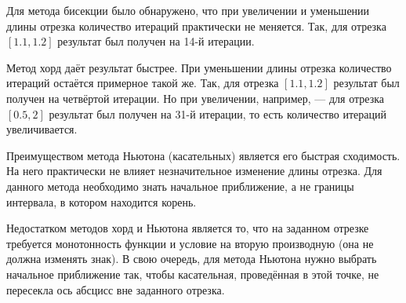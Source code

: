 Для метода бисекции было обнаружено, что при увеличении и уменьшении длины отрезка количество итераций практически не меняется.
Так, для отрезка $ \left[ 1.1, 1.2 \right] $ результат был получен на 14-й итерации.

Метод хорд даёт результат быстрее.
При уменьшении длины отрезка количество итераций остаётся примерное такой же.
Так, для отрезка $ \left[ 1.1, 1.2 \right] $ результат был получен на четвёртой итерации.
Но при увеличении, например, --- для отрезка $ \left[ 0.5, 2 \right] $ результат был получен на 31-й итерации, то есть количество итераций увеличивается.

Преимуществом метода Ньютона (касательных) является его быстрая сходимость.
На него практически не влияет незначительное изменение длины отрезка.
Для данного метода необходимо знать начальное приближение, а не границы интервала, в котором находится корень.

Недостатком методов хорд и Ньютона является то, что на заданном отрезке требуется монотонность функции и условие на вторую производную (она не должна изменять знак).
В свою очередь, для метода Ньютона нужно выбрать начальное приближение так, чтобы касательная, проведённая в этой точке, не пересекла ось абсцисс вне заданного отрезка.


